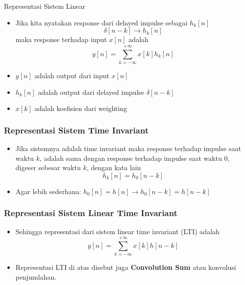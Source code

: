 \documentclass[pdflatex,compress,mathserif]{beamer}
\begin{document}
\begin{frame}{Representasi Sistem Linear}
	\begin{itemize}
		\item Jika kita nyatakan response dari delayed impulse sebagai $ h_k [n] $
		\begin{equation*}
		\delta[n-k] \rightarrow h_k[n]
		\end{equation*}
		maka response terhadap input $ x[n] $ adalah
		\begin{equation*}
		y[n] = \sum\limits_{k = -\infty}^{+\infty} x[k]h_k[n]
		\end{equation*}
		\item[] $ y[n] $ adalah output dari input $ x[n] $
		\item[] $ h_k[n] $ adalah output dari delayed impulse $ \delta[n-k] $
		\item[] $ x[k] $ adalah koefisien dari weighting
	\end{itemize}
\end{frame}

\begin{frame}
	\frametitle{Representasi Sistem Time Invariant}
	\begin{itemize}
		\item Jika sistemnya adalah time invariant maka response terhadap impulse saat waktu $ k $, adalah sama dengan response terhadap impulse saat waktu 0, digeser sebesar waktu $ k $, dengan kata lain
		\begin{equation*}
			h_k[n] = h_0[n-k]
		\end{equation*}
		\item Agar lebih sederhana: $ h_0[n] = h[n] \rightarrow h_0[n-k] = h[n-k] $
	\end{itemize}
\end{frame}

\begin{frame}
	\frametitle{Representasi Sistem Linear Time Invariant}
	\begin{itemize}
		\item Sehingga representasi dari sistem linear time invariant (LTI) adalah
		\begin{equation*}
			y[n] = \sum\limits_{k = -\infty}^{+\infty} x[k]h[n-k]
		\end{equation*}
		\item Representasi LTI di atas disebut juga \textbf{Convolution Sum} atau konvolusi penjumlahan.
	\end{itemize}
\end{frame}
\end{document}
